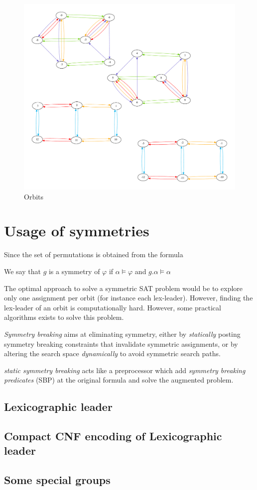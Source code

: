  \begin{figure}[h]
 	\centering
 		\includegraphics[width=\textwidth]{cnfs/orbits}
 	\caption{Orbits}
 \end{figure}



\section{Usage of symmetries}

Since the set of permutations is obtained from the formula

We say that $g$ is a symmetry of $\varphi$ if $\alpha \models \varphi$ and $ g.\alpha \models \alpha$


The optimal approach to solve a symmetric SAT problem would be to explore
only one assignment per orbit (for instance each lex-leader). However, finding the
lex-leader of an orbit is computationally hard. 
However, some practical algorithms exists to solve this problem.


\emph{Symmetry breaking} aims at eliminating symmetry, either
by \emph{statically} posting symmetry breaking constraints that invalidate symmetric
assignments, or by altering the search space \emph{dynamically} to avoid symmetric search paths.

\emph{static symmetry breaking} acts like a preprocessor which add \emph{symmetry breaking predicates} (SBP)
at the original formula and solve the augmented problem.


\subsection{Lexicographic leader}
\subsection{Compact CNF encoding of Lexicographic leader}

\subsection{Some special groups}




